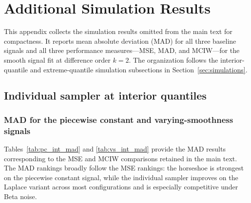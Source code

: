 \section{Additional Simulation Results}
\label{app:simulation_results}

This appendix collects the simulation results omitted from the main text for
compactness.  It reports mean absolute deviation (MAD) for all three baseline
signals and all three performance measures---MSE, MAD, and MCIW---for the
smooth signal fit at difference order $k=2$.  The organization follows the
interior-quantile and extreme-quantile simulation subsections in
Section~\ref{sec:simulations}.

\subsection{Individual sampler at interior quantiles}
\label{app:sim:individual}

\subsubsection{MAD for the piecewise constant and varying-smoothness signals}

Tables~\ref{tab:pc_int_mad} and \ref{tab:vs_int_mad} provide the MAD results
corresponding to the MSE and MCIW comparisons retained in the main text.  The
MAD rankings broadly follow the MSE rankings: the horseshoe is strongest on
the piecewise constant signal, while the individual sampler improves on the
Laplace variant across most configurations and is especially competitive
under Beta noise.

